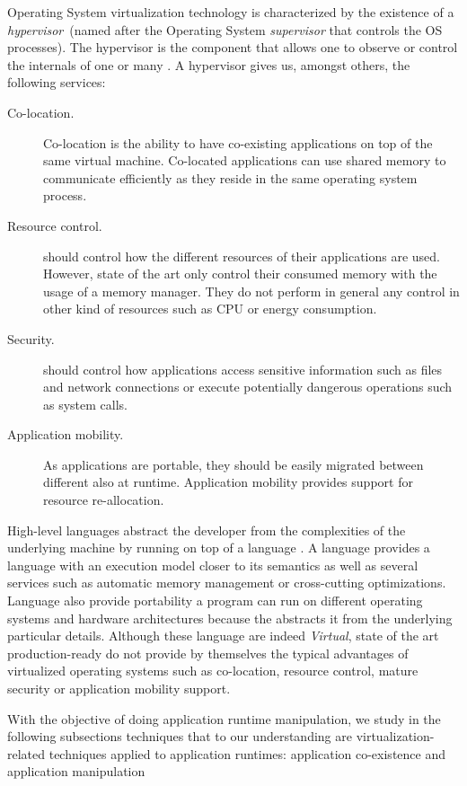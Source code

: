 Operating System virtualization technology is characterized by the existence of a \emph{hypervisor}~(named after the Operating System \emph{supervisor} that controls the OS processes). The hypervisor is the \VM component that allows one to observe or control the internals of one or many \VMs. A \VM hypervisor gives us, amongst others, the following services:

\begin{description}
\item[Co-location.] Co-location is the ability to have co-existing applications on top of the same virtual machine. 
Co-located applications can use shared memory to communicate efficiently as they reside in the same operating system process.

\item[Resource control.] \VMs should control how the different resources of their applications are used. However, state of the art \VMs only control their consumed memory with the usage of a memory manager. They do not perform in general any control in other kind of resources such as CPU or energy consumption.
\item[Security.] \VMs should control how applications access sensitive information such as files and network connections or execute potentially dangerous operations such as system calls.
\item[Application mobility.] As applications are portable, they should be easily migrated between different \VMs also at runtime. Application mobility provides support for resource re-allocation.
\end{description}

High-level languages abstract the developer from the complexities of the underlying machine by running on top of a language \VM. A language \VM provides a language with an execution model closer to its semantics as well as several services such as automatic memory management or cross-cutting optimizations. Language \VMs also provide portability \ie a program can run on different operating systems and hardware architectures because the \VM abstracts it from the underlying particular details. Although these language \VMs are indeed \emph{Virtual}, state of the art production-ready \VMs do not provide by themselves the typical advantages of virtualized operating systems such as co-location, resource control, mature security or application mobility support.

With the objective of doing application runtime manipulation, we study in the following subsections techniques that to our understanding are virtualization-related techniques applied to application runtimes: application co-existence and application manipulation%

